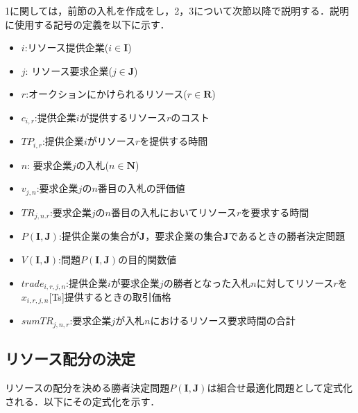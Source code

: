 1に関しては，前節の入札を作成をし，2，3について次節以降で説明する．説明に使用する記号の定義を以下に示す．

\begin{itemize}
\tightlist
\item
  \(i\):リソース提供企業(\(i \in \boldsymbol{I}\))
\item
  \(j\): リソース要求企業(\(j \in \boldsymbol{J}\))
\item
  \(r\):オークションにかけられるリソース(\(r \in \boldsymbol{R}\))
\item
  \(c_{i,r}\):提供企業\(i\)が提供するリソース\(r\)のコスト
\item
  \(TP_{i,r}\):提供企業\(i\)がリソース\(r\)を提供する時間
\item
  \(n\): 要求企業\(j\)の入札(\(n \in \boldsymbol{N}\))
\item
  \(v_{j,n}\):要求企業\(j\)の\(n\)番目の入札の評価値
\item
  \(TR_{j,n.r}\):要求企業\(j\)の\(n\)番目の入札においてリソース\(r\)を要求する時間
\item
  \(P(\boldsymbol{I},\boldsymbol{J})\):提供企業の集合が\(\boldsymbol{J}\)，要求企業の集合\(\boldsymbol{J}\)であるときの勝者決定問題
\item
  \(V(\boldsymbol{I},\boldsymbol{J})\):問題\(P(\boldsymbol{I},\boldsymbol{J})\)の目的関数値
\item
  \(trade_{i,r,j,n}\):提供企業\(i\)が要求企業\(j\)の勝者となった入札\(n\)に対してリソース\(r\)を\(x_{i,r,j,n}\){[}Ts{]}提供するときの取引価格
\item
  \(sumTR_{j,n,r}\):要求企業\(j\)が入札\(n\)におけるリソース要求時間の合計
\end{itemize}

\hypertarget{ux30eaux30bdux30fcux30b9ux914dux5206ux306eux6c7aux5b9a}{%
\subsection{リソース配分の決定}\label{ux30eaux30bdux30fcux30b9ux914dux5206ux306eux6c7aux5b9a}}

リソースの配分を決める勝者決定問題\(P(\boldsymbol{I},\boldsymbol{J})\)は組合せ最適化問題として定式化される．以下にその定式化を示す．

